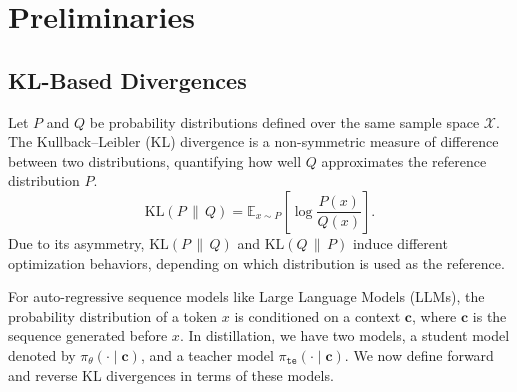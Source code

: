 
\section{Preliminaries}

\subsection{KL-Based Divergences}
\label{subsec:kl_divergences}


Let $P$ and $Q$ be probability distributions defined over the same sample space $\mathcal{X}$.
The Kullback--Leibler (KL) divergence is a non-symmetric measure of difference between two distributions, quantifying how well $Q$ approximates the reference distribution $P$.
\begin{equation}
\label{eq:kl_general}
\mathrm{KL}(P \,\|\, Q)
= \mathbb{E}_{x \sim P} \left[ \log \frac{P(x)}{Q(x)} \right].
\end{equation}
Due to its asymmetry, $\mathrm{KL}(P \,\|\, Q)$ and $\mathrm{KL}(Q \,\|\, P)$ induce different optimization behaviors, depending on which distribution is used as the reference.

For auto-regressive sequence models like Large Language Models (LLMs), the probability distribution of a token $x$ is conditioned on a context $\mathbf{c}$, where $\mathbf{c}$ is the sequence generated before $x$. 
In distillation, we have two models, a student model denoted by $\pi_\theta(\cdot \mid \mathbf{c})$, and a teacher model $\pi_{\texttt{te}}(\cdot \mid \mathbf{c})$. We now define forward and reverse KL divergences in terms of these models.


